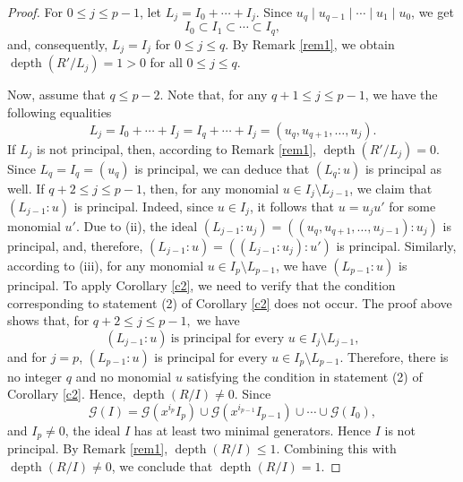 \documentclass[11pt]{amsart}
\def\depth{\operatorname{depth}}
\begin{document}
\begin{proof}
For $0\leq j\leq p-1$, let $L_j=I_0+\cdots+I_j$. Since $u_q\mid u_{q-1} \mid  \cdots \mid u_1 \mid u_0$, we get
$$I_0\subset I_1 \subset \cdots \subset I_q,$$
and, consequently, $L_j=I_j$ for $0\leq j\leq q$. By Remark \ref{rem1}, we obtain $\depth(R'/L_j)=1>0$ for all $0\leq j\leq q$.

Now, assume that $q\leq p-2$. Note that, for any $q+1\leq j\leq p-1$, we have the following equalities 
$$L_j=I_0+\cdots+I_j=I_q+\cdots+I_j=(u_q,u_{q+1},\ldots,u_j).$$ 
If $L_j$ is not principal, then, according to Remark \ref{rem1}, $\depth(R'/L_j)=0$. 
Since $L_q = I_q = (u_q)$  is  principal, we can deduce that $(L_q:u)$ is principal as well. 
If $q+2\leq j\leq p-1$,   then, for any monomial $u\in I_{j}\setminus L_{j-1}$, we claim that
$(L_{j-1}:u)$ is principal. Indeed, since $u\in I_{j}$, it follows that $u=u_{j}u'$ for some monomial $u'$.
Due to  (ii), the ideal $(L_{j-1}:u_{j}) = ((u_{q},u_{q+1},\ldots,u_{j-1}):u_j)$ is principal, 
and, therefore, $(L_{j-1}:u)=((L_{j-1}:u_j):u')$ is principal.
Similarly, according to (iii), for any monomial $u\in I_p\setminus L_{p-1}$, we have  $(L_{p-1}:u)$ is principal.
To apply Corollary \ref{c2}, we need to verify that the condition
corresponding to statement {\rm (2)} of Corollary \ref{c2} does not occur.
 The proof above shows that, for $q+2\leq j\leq p-1,$ we have
\[
(L_{j-1}:u)\ \text{is principal for every }u\in I_{j}\setminus L_{j-1},
\]
and  for \(j=p\), $(L_{p-1}:u)$ is principal for every $u\in I_p\setminus L_{p-1}.$ 
Therefore, there is no integer \(q\) and no monomial \(u\) satisfying the
condition in statement {\rm (2)} of Corollary \ref{c2}. Hence, $\depth(R/I)\neq 0.$ 
Since $$\mathcal{G}(I)=\mathcal{G}(x^{i_p}I_p)\cup
\mathcal{G}(x^{i_{p-1}}I_{p-1})\cup\cdots\cup\mathcal{G}(I_0),$$
and \(I_p\neq 0\), the ideal \(I\) has at least two minimal generators.
Hence \(I\) is not principal. By Remark \ref{rem1},
 $\depth(R/I)\leq 1.$ Combining this with \(\depth(R/I)\neq0\), we conclude that
$\depth(R/I)=1.$
\end{proof}
\end{document}
